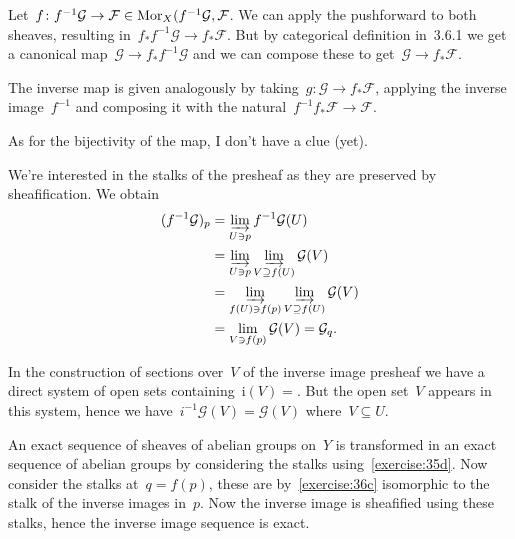 \begin{exercise} %
  Let~$f\colon f^{-1}\mathcal{G}\to\mathcal{F}\in\operatorname{Mor}_X(f^{-1}\mathcal{G},\mathcal{F}$. We can apply the pushforward to both sheaves, resulting in~$f_*f^{-1}\mathcal{G}\to f_*\mathcal{F}$. But by categorical definition in~3.6.1 we get a canonical map~$\mathcal{G}\to f_*f^{-1}\mathcal{G}$ and we can compose these to get~$\mathcal{G}\to f_*\mathcal{F}$.

  The inverse map is given analogously by taking~$g\colon\mathcal{G}\to f_*\mathcal{F}$, applying the inverse image~$f^{-1}$ and composing it with the natural~$f^{-1}f_*\mathcal{F}\to\mathcal{F}$.

  As for the bijectivity of the map, I don't have a clue (yet).
\end{exercise}

\begin{exercise}
  We're interested in the stalks of the presheaf as they are preserved by sheafification. We obtain
  \begin{equation}
    \begin{aligned}
      (f^{-1}\mathcal{G})_p&=\varinjlim_{U\ni p}f^{-1}\mathcal{G}(U) \\
      &=\varinjlim_{U\ni p}\varinjlim_{V\supseteq f(U)}\mathcal{G}(V) \\
      &=\varinjlim_{f(U)\ni f(p)}\varinjlim_{V\supseteq f(U)}\mathcal{G}(V) \\
      &=\lim_{V\ni f(p)}\mathcal{G}(V)=\mathcal{G}_q.
    \end{aligned}
  \end{equation}
\end{exercise}

\begin{exercise}
  \label{exercise:36c}
  In the construction of sections over~$V$ of the inverse image presheaf we have a direct system of open sets containing~$\mathrm{i}(V)=$. But the open set~$V$ appears in this system, hence we have~$i^{-1}\mathcal{G}(V)=\mathcal{G}(V)$ where~$V\subseteq U$.
\end{exercise}

\begin{exercise}
  An exact sequence of sheaves of abelian groups on~$Y$ is transformed in an exact sequence of abelian groups by considering the stalks using~\autoref{exercise:35d}. Now consider the stalks at~$q=f(p)$, these are by~\autoref{exercise:36c} isomorphic to the stalk of the inverse images in~$p$. Now the inverse image is sheafified using these stalks, hence the inverse image sequence is exact.
\end{exercise}

